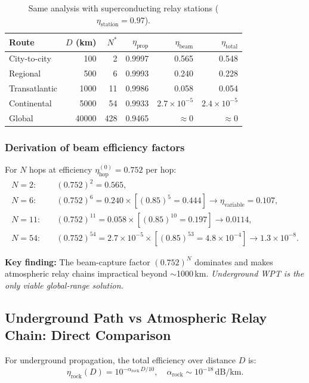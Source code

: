 \documentclass[aps,prd,twocolumn,superscriptaddress]{revtex4-2}
\newcommand{\etahop}{\eta_\mathrm{hop}}
\newcommand{\etastat}{\eta_\mathrm{station}}
\newcommand{\alpharock}{\alpha_\mathrm{rock}}
\begin{document}
\begin{table}[H]
\centering
\caption{Same analysis with superconducting relay stations
($\etastat = 0.97$).}
\label{tab:multihop_sc}
\begin{tabular}{lrrrrr}
\toprule
Route & $D$ (km) & $N^*$ & $\eta_\mathrm{prop}$ & $\eta_\mathrm{beam}$ & $\eta_\mathrm{total}$ \\
\midrule
City-to-city & 100  & 2  & 0.9997 & 0.565 & 0.548 \\
Regional     & 500  & 6  & 0.9993 & 0.240 & 0.228 \\
Transatlantic& 1000 & 11 & 0.9986 & 0.058 & 0.054 \\
Continental  & 5000 & 54 & 0.9933 & $2.7\times10^{-5}$ & $2.4\times10^{-5}$ \\
Global       & 40000& 428& 0.9465 & $\approx 0$ & $\approx 0$ \\
\bottomrule
\end{tabular}
\end{table}

\subsubsection{Derivation of beam efficiency factors}

For $N$ hops at efficiency $\etahop^{(0)} = 0.752$ per hop:
\begin{align}
N=2: & \quad (0.752)^2 = 0.565, \\
N=6: & \quad (0.752)^6 = 0.240 \times [(0.85)^5 = 0.444] \to \eta_\mathrm{variable} = 0.107, \\
N=11: & \quad (0.752)^{11} = 0.058 \times [(0.85)^{10} = 0.197] \to 0.0114, \\
N=54: & \quad (0.752)^{54} = 2.7\times10^{-5}
  \times [(0.85)^{53} = 4.8\times10^{-4}] \to 1.3\times10^{-8}.
\end{align}

\textbf{Key finding:} The beam-capture factor $(0.752)^N$ dominates and
makes atmospheric relay chains impractical beyond $\sim$1000\,km.
\emph{Underground WPT is the only viable global-range solution.}

\subsection{Underground Path vs Atmospheric Relay Chain: Direct Comparison}

For underground propagation, the total efficiency over distance $D$ is:
\begin{equation}
\eta_\mathrm{rock}(D) = 10^{-\alpharock\,D/10},
\quad \alpharock \sim 10^{-18}\,\mathrm{dB/km}.
\label{eq:eta_rock}
\end{equation}
\end{document}
